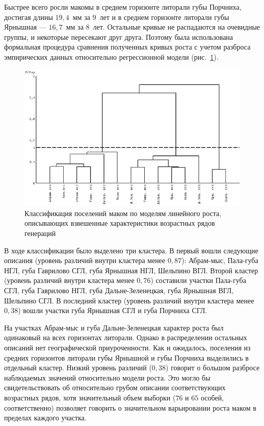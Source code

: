 Быстрее   всего   росли   макомы   в   среднем   горизонте   литорали   губы Порчниха, достигая длины $19,4$~мм за $9$~лет и в среднем горизонте литорали губы Ярнышная --- $16,7$~мм за $8$~лет. 
Остальные кривые не распадаются на очевидные группы, и некоторые пересекают   друг   друга.   
Поэтому   была   использована   формальная   процедура   сравнения полученных   кривых   роста   с   учетом   разброса   эмпирических   данных   относительно регрессионной модели (рис.~\ref{ris:dendrogramma_linear_all_gorizonts}).
    \begin{figure}[p]
        \includegraphics[width=\textwidth]{../Barenc_Sea/growth_from_MSc/dendrogramma_sravnenie_rosta_linear_all_gorizonts.jpg}
    \caption{Классификация поселений маком по моделям линейного роста, описывающих взвешенные характеристики возрастных рядов генераций}
    \label{ris:dendrogramma_linear_all_gorizonts}
    \end{figure}

В   ходе   классификации   было   выделено   три   кластера.   
В   первый   вошли   следующие описания (уровень различий внутри кластера менее $0,87$): Абрам-мыс, Пала-губа НГЛ, губа Гаврилово   СГЛ,   губа   Ярнышная   НГЛ,   Шельпино   ВГЛ.   
Второй   кластер   (уровень   различий внутри кластера менее $0,76$) составили участки Пала-губа СГЛ, губа Гаврилово НГЛ, губа Дальне-Зеленецкая,   губа   Ярнышная   ВГЛ,   Шельпино   СГЛ.   
В   последний   кластер   (уровень различий внутри кластера менее $0,38$) вошли участки губа Ярнышная СГЛ и губа Порчниха СГЛ. 

На участках Абрам-мыс и губа Дальне-Зеленецкая характер роста был одинаковый на всех горизонтах литорали. 
Однако в распределении остальных описаний нет географической приуроченности. 
Как и ожидалось, поселения  из средних горизонтов литорали губы Ярнышной и губы Порчниха   выделились   в   отдельный   кластер.   
Низкий   уровень   различий   ($0,38$)   говорит   о большом   разбросе   наблюдаемых   значений   относительно   модели   роста.   
Это   могло   бы свидетельствовать   об   относительно   грубом   описании   соответствующих   возрастных   рядов, хотя   значительный объем  выборки ($76$  и $65$  особей, соответственно)  позволяет  говорить  о значительном варьировании роста маком в пределах каждого участка.

